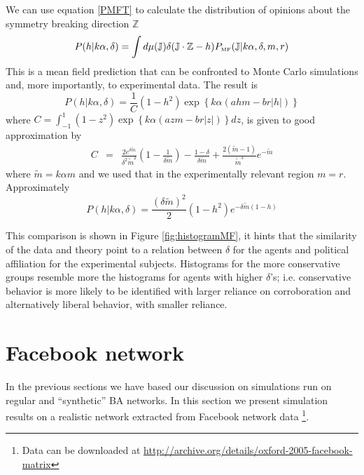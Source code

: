 \documentclass[twocolumn,showpacs]{revtex4-1}
\begin{document}
We can use equation \ref{PMFT} to calculate the distribution 
of opinions about  the symmetry breaking direction  $\mathbb{Z}$
\begin{equation}
P(h|k\alpha, \delta)= \int d\mu(\mathbb{J}) 
\delta (\mathbb{J}\cdot\mathbb{Z} - h)
P_{\mbox{\tiny MF}}(\mathbb{J}|k\alpha, \delta, m, r)
\end{equation}
This is a mean field prediction that can be confronted to Monte Carlo
simulations and, more importantly, to experimental data. 
The result is
\begin{equation}
P(h|k\alpha, \delta)=\frac{1}{C}(1-h^2)\exp\left\{ k\alpha
\left( a h m - b r |h| \right) \right\}
\end{equation}
where ${C}=\int_{-1}^{1}(1-z^2)\exp\left\{ k\alpha
\left( a z m - b r |z| \right) \right\}dz$, is given to good approximation by
\begin{eqnarray}
C&=&\frac{2e^{\delta\tilde{m}}}{\delta^2 \tilde{m}^2}\left(1-\frac{1}{\delta\tilde{m}}\right)
 -\frac{1-\delta}{\delta \tilde{m}} 
+\frac{2(\tilde{m}-1)}{\tilde{m}^3}e
^{-\tilde{m}}
\end{eqnarray}
where $\tilde{m}= k\alpha m$ and we used that in the experimentally
relevant region $m=r$. Approximately
\begin{equation}
P(h|k\alpha, \delta)=\frac{(\delta\tilde{m})^2}{2}(1-h^2)e^{-\delta \tilde{m}
(1-h)}
\end{equation}

This comparison is shown in 
 Figure \ref{fig:histogramMF}, it hints  that the similarity
of the data and theory point to a relation between $\delta$
for the agents and political affiliation for the experimental subjects. 
Histograms for the more conservative groups resemble more the histograms
for agents with higher $\delta$'s; i.e. conservative behavior is more 
likely to be identified with larger reliance on corroboration and alternatively liberal behavior,  with smaller reliance. 

\section{Facebook network}
\label{sec:facebook}

In the previous sections we have based our discussion on simulations run on regular and ``synthetic'' BA networks. In this section we present simulation results on a realistic network extracted from Facebook network data \cite{traudetal,traud2} \footnote{Data can be downloaded at
\href{http://archive.org/details/oxford-2005-facebook-matrix}{http://archive.org/details/oxford-2005-facebook-matrix}}. 
\end{document}
